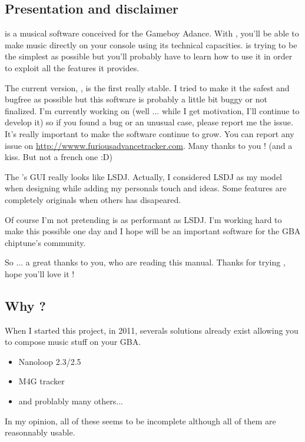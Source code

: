 \subsection{Presentation and disclaimer}
\FAT is a musical software conceived for the Gameboy Adance.
With \FAT, you'll be able to make music directly on your console using its technical capacities.
\FAT is trying to be the simplest as possible but you'll probably have to learn how to use it in order to exploit all the features it provides.
\medskip

The current version, \fatversion, is the first really stable.
I tried to make it the safest and bugfree as possible but this software is probably a little bit buggy or not finalized.
I'm currently working on \FAT (well ... while I get motivation, I'll continue to develop it) so if you found a bug or an unusual case, please report me the issue.
It's really important to make the software continue to grow. You can report any issue on \url{http://wwww.furiousadvancetracker.com}.
Many thanks to you ! (and a kiss. But not a french one :D)
\medskip

The \FAT's GUI really looks like LSDJ. Actually, I considered LSDJ as my model when designing \FAT while adding my personals touch and ideas.
Some features are completely originals when others has disapeared.
\medskip

Of course I'm not pretending \FAT is as performant as LSDJ. I'm working hard to make this possible one day and I hope \FAT will be an important software for the GBA chiptune's community.
\medskip

So ... a great thanks to you, who are reading this manual. Thanks for trying \FAT, hope you'll love it !

\subsection{Why \FAT ?}
When I started this project, in 2011, severals solutions already exist allowing you to compose music stuff on your GBA.
\medskip

\begin{itemize}
    \item{Nanoloop 2.3/2.5}
    \item{M4G tracker}
    \item{and problably many others...}
\end{itemize}\medskip

In my opinion, all of these seems to be incomplete although all of them are reasonnably usable.
\medskip

